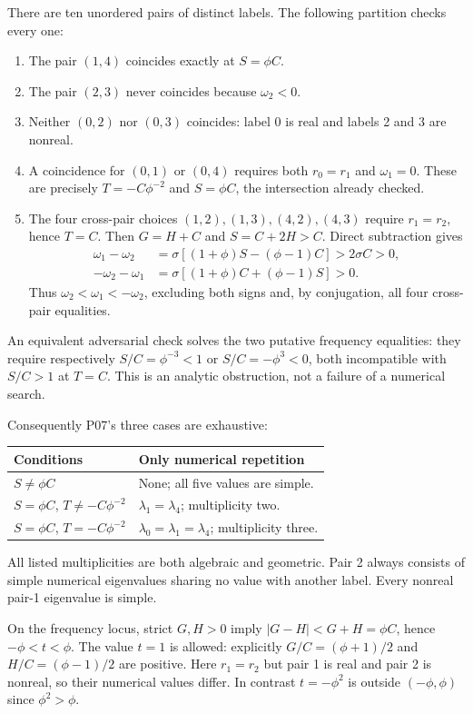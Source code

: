 \documentclass[11pt]{article}
\begin{document}
There are ten unordered pairs of distinct labels. The following
partition checks every one:
\begin{enumerate}
\item The pair $(1,4)$ coincides exactly at $S=\phi C$.
\item The pair $(2,3)$ never coincides because $\omega_2<0$.
\item Neither $(0,2)$ nor $(0,3)$ coincides: label 0 is real and
labels 2 and 3 are nonreal.
\item A coincidence for $(0,1)$ or $(0,4)$ requires both
$r_0=r_1$ and $\omega_1=0$. These are precisely
$T=-C\phi^{-2}$ and $S=\phi C$, the intersection already checked.
\item The four cross-pair choices $(1,2),(1,3),(4,2),(4,3)$
require $r_1=r_2$, hence $T=C$. Then $G=H+C$ and
$S=C+2H>C$. Direct subtraction gives
\begin{align*}
 \omega_1-\omega_2&=\sigma[(1+\phi)S-(\phi-1)C]>2\sigma C>0,\\
 -\omega_2-\omega_1&=\sigma[(1+\phi)C+(\phi-1)S]>0.
\end{align*}
Thus $\omega_2<\omega_1<-\omega_2$, excluding both signs and,
by conjugation, all four cross-pair equalities.
\end{enumerate}
An equivalent adversarial check solves the two putative frequency
equalities: they require respectively $S/C=\phi^{-3}<1$ or
$S/C=-\phi^3<0$, both incompatible with $S/C>1$ at $T=C$.
This is an analytic obstruction, not a failure of a numerical search.

Consequently P07's three cases are exhaustive:
\begin{center}
\begin{tabular}{@{}L{0.49\textwidth}L{0.46\textwidth}@{}}
\toprule Conditions&Only numerical repetition\\\midrule
$S\ne\phi C$&None; all five values are simple.\\
$S=\phi C$, $T\ne-C\phi^{-2}$&$\lambda_1=\lambda_4$; multiplicity two.\\
$S=\phi C$, $T=-C\phi^{-2}$&$\lambda_0=\lambda_1=\lambda_4$; multiplicity three.\\\bottomrule
\end{tabular}
\end{center}
All listed multiplicities are both algebraic and geometric. Pair 2
always consists of simple numerical eigenvalues sharing no value with
another label. Every nonreal pair-1 eigenvalue is simple.

On the frequency locus, strict $G,H>0$ imply
$|G-H|<G+H=\phi C$, hence $-\phi<t<\phi$. The value $t=1$
is allowed: explicitly $G/C=(\phi+1)/2$ and
$H/C=(\phi-1)/2$ are positive. Here $r_1=r_2$ but pair 1 is
real and pair 2 is nonreal, so their numerical values differ. In
contrast $t=-\phi^2$ is outside $(-\phi,\phi)$ since $\phi^2>\phi$.
\end{document}
